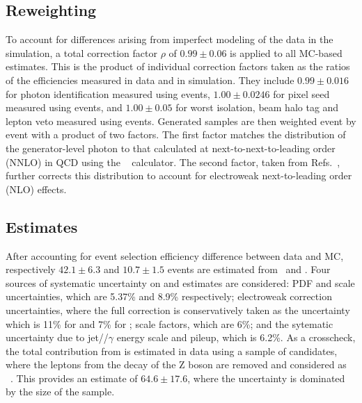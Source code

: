  \subsection{Reweighting}\label{subsubsec:lg_reweighting}
To account for differences arising from imperfect modeling of the data in
 the simulation, a total correction factor $\rho$ of $0.99\pm0.06$ is applied to all 
 MC-based  estimates. 
This is the product of individual correction factors taken as the
 ratios of the efficiencies measured in data and in simulation. 
They include
 $0.99\pm0.016$ for photon identification measured using \zee events,
 $1.00\pm0.0246$ for pixel seed measured using \zee events, and
 $1.00\pm0.05$ for worst isolation, beam halo tag and lepton veto measured using \zgnng events.
Generated samples are then weighted event by event with a product of two factors. 
The first factor matches the distribution of the generator-level photon
 \pt to that calculated at next-to-next-to-leading order (NNLO) in QCD using the 
 \DYRes~\cite{Catani:2015vma} calculator.
The second factor, taken from
 Refs.~\cite{Denner:2014bna,Denner:2015fca}, further corrects this distribution
 to account for electroweak next-to-leading order (NLO) effects. 

 \subsection{\vg Estimates}
After accounting for event selection efficiency difference between data and MC,
 respectively $42.1 \pm 6.3$ and $10.7 \pm 1.5$ events are estimated
 from \zgnng\ and \wglng. 
Four sources of systematic uncertainty on \zg and \wg estimates are considered:
 PDF and scale uncertainties, which are 5.37\% and 8.9\% respectively;
 electroweak correction uncertainties,
 where the full correction is conservatively taken as the uncertainty
 which is 11\% for \zg and 7\% for \wg;
 scale factors, which are 6\%;
 and the sytematic uncertainty due to jet/\met/$\gamma$ energy scale and pileup, which is 6.2\%. 
As a crosscheck, the total contribution from \zgnng is estimated
 in data using a sample of \zgllg candidates,
 where the leptons from the decay of the Z boson are removed and considered as
 \met~\cite{monojet2014}. 
This provides an estimate of $64.6 \pm 17.6$, 
 where the uncertainty is dominated by the size of the sample.

